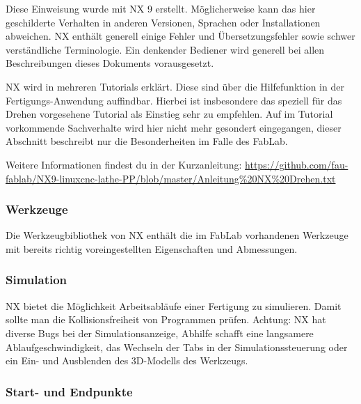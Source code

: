 \documentclass{\basedir/fablab-document}
\begin{document}
Diese Einweisung wurde mit NX 9 erstellt. Möglicherweise kann das hier geschilderte Verhalten in anderen Versionen, Sprachen oder Installationen abweichen. NX enthält generell einige Fehler und Übersetzungsfehler sowie schwer verständliche Terminologie. Ein denkender Bediener wird generell bei allen Beschreibungen dieses Dokuments vorausgesetzt.

NX wird in mehreren Tutorials erklärt. Diese sind über die Hilfefunktion in der Fertigungs-Anwendung auffindbar. Hierbei ist insbesondere das speziell für das Drehen vorgesehene Tutorial als Einstieg sehr zu empfehlen. Auf im Tutorial vorkommende Sachverhalte wird hier nicht mehr gesondert eingegangen, dieser Abschnitt beschreibt nur die Besonderheiten im Falle des FabLab.

 Weitere Informationen findest du in der Kurzanleitung: \url{https://github.com/fau-fablab/NX9-linuxcnc-lathe-PP/blob/master/Anleitung%20NX%20Drehen.txt}

\subsubsection{Werkzeuge}
Die Werkzeugbibliothek von NX enthält die im FabLab vorhandenen Werkzeuge mit bereits richtig voreingestellten Eigenschaften und Abmessungen. 



\subsubsection{Simulation}

NX bietet die Möglichkeit Arbeitsabläufe einer Fertigung zu simulieren. Damit sollte man die Kollisionsfreiheit von Programmen prüfen. Achtung: NX hat diverse Bugs bei der Simulationsanzeige, Abhilfe schafft eine langsamere Ablaufgeschwindigkeit, das Wechseln der Tabs in der Simulationssteuerung oder ein Ein- und Ausblenden des 3D-Modells des Werkzeugs.

\subsubsection{Start- und Endpunkte}
\end{document}
